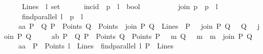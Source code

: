 \begin{isabellebody}
\ \ \ \ \ Lines\ {\isacharcolon}{\kern0pt}{\isacharcolon}{\kern0pt}\ {\isachardoublequoteopen}{\isacharprime}{\kern0pt}l\ set{\isachardoublequoteclose}\ \isanewline
\ \ \ \ \ incid\ {\isacharcolon}{\kern0pt}{\isacharcolon}{\kern0pt}\ {\isachardoublequoteopen}{\isacharprime}{\kern0pt}p\ {\isasymRightarrow}\ {\isacharprime}{\kern0pt}l\ {\isasymRightarrow}\ bool{\isachardoublequoteclose}\ \ {\isacharparenleft}{\kern0pt}\ {\isachardoublequoteopen}{\isasymlhd}{\isachardoublequoteclose}\ {}{}{\isacharparenright}{\kern0pt}\ \isanewline
\ \ \ \ \ join{\isacharcolon}{\kern0pt}{\isacharcolon}{\kern0pt}\ {\isachardoublequoteopen}{\isacharprime}{\kern0pt}p\ {\isasymRightarrow}\ {\isacharprime}{\kern0pt}p\ {\isasymRightarrow}\ {\isacharprime}{\kern0pt}l{\isachardoublequoteclose}\ \isanewline
\ \ \ \ \ find{\isacharunderscore}{\kern0pt}parallel{\isacharcolon}{\kern0pt}{\isacharcolon}{\kern0pt}\ {\isachardoublequoteopen}{\isacharprime}{\kern0pt}l\ {\isasymRightarrow}\ {\isacharprime}{\kern0pt}p\ {\isasymRightarrow}\ {\isacharprime}{\kern0pt}l{\isachardoublequoteclose}\ {\isacharplus}{\kern0pt}\isanewline
\ \ \ \isanewline
\ \ \ \ a{}a{\isacharcolon}{\kern0pt}\ {\isachardoublequoteopen}{\isasymlbrakk}P\ {\isasymnoteq}\ Q{\isacharsemicolon}{\kern0pt}\ P\ {\isasymin}\ Points{\isacharsemicolon}{\kern0pt}\ Q\ {\isasymin}\ Points{\isasymrbrakk}\ {\isasymLongrightarrow}\ join\ P\ Q\ {\isasymin}\ Lines\ {\isasymand}\ P\ {\isasymlhd}\ \ {\isacharparenleft}{\kern0pt}join\ P\ Q{\isacharparenright}{\kern0pt}\ \ {\isasymand}\ Q\ {\isasymlhd}\ \ {\isacharparenleft}{\kern0pt}join\ P\ Q{\isacharparenright}{\kern0pt}{\isachardoublequoteclose}\ \isanewline
\ \ \ \ a{}b{\isacharcolon}{\kern0pt}\ {\isachardoublequoteopen}{\isasymlbrakk}P\ {\isasymnoteq}\ Q{\isacharsemicolon}{\kern0pt}\ P\ {\isasymin}\ Points{\isacharsemicolon}{\kern0pt}\ Q\ {\isasymin}\ Points{\isacharsemicolon}{\kern0pt}\ P\ {\isasymlhd}\ \ m{\isacharsemicolon}{\kern0pt}\ Q\ {\isasymlhd}\ \ m{\isasymrbrakk}\ {\isasymLongrightarrow}\ m\ {\isacharequal}{\kern0pt}\ join\ P\ Q{\isachardoublequoteclose}\ \isanewline
\ \ \ \ a{}a{\isacharcolon}{\kern0pt}\ {\isachardoublequoteopen}{\isasymlbrakk}\ P\ {\isasymin}\ Points{\isacharsemicolon}{\kern0pt}\ l\ {\isasymin}\ Lines{\isasymrbrakk}\ {\isasymLongrightarrow}\ find{\isacharunderscore}{\kern0pt}parallel\ l\ P\ {\isasymin}\ Lines{\isachardoublequoteclose}\ \isanewline

\end{isabellebody}
